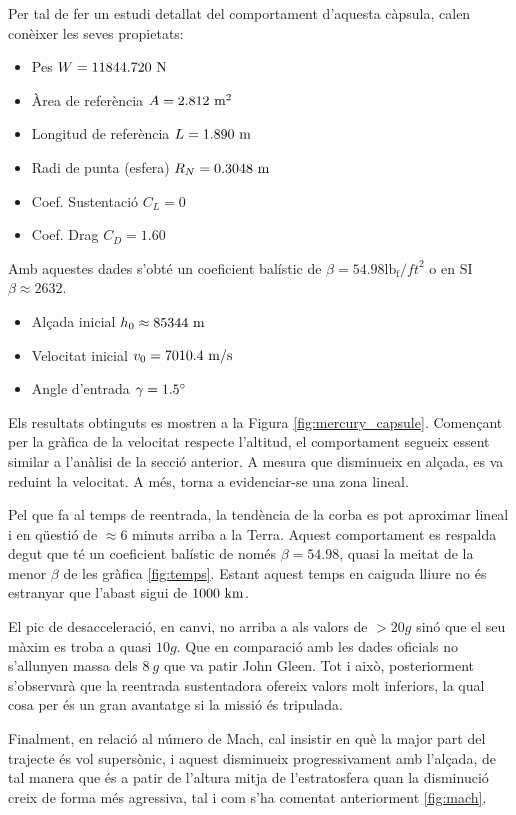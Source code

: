 Per tal de fer un estudi detallat del comportament d'aquesta càpsula, calen conèixer les seves propietats:
\begin{itemize}
    \item Pes $W = 11844.720 \ \newton$
    \item Àrea de referència $A = 2.812 \ \meter^2$
    \item Longitud de referència $L = 1.890 \ \meter$
    \item Radi de punta (esfera) $R_N = 0.3048 \ \meter$
    \item Coef. Sustentació $C_L = 0 $
    \item Coef. Drag $C_D = 1.60 $
\end{itemize}
Amb aquestes dades s'obté un coeficient balístic de $\beta=54.98 \mathrm{lb_f}/{ft}^2$ o en $\mathrm{SI}$ $\beta \approx 2632$.
\begin{itemize}
    \item Alçada inicial $h_0 \approx 85344 \ \meter$
    \item Velocitat inicial $v_0 = 7010.4 \ \meter/\second$
    \item Angle d'entrada $\gamma = 1.5 \degrees$
\end{itemize}

Els resultats obtinguts es mostren a la Figura \ref{fig:mercury_capsule}. Començant per la gràfica de la velocitat respecte l'altitud, el comportament segueix essent similar a l'anàlisi de la secció anterior. A mesura que disminueix en alçada, es va reduint la velocitat. A més, torna a evidenciar-se una zona lineal.

Pel que fa al temps de reentrada, la tendència de la corba es pot aproximar lineal i en qüestió de $\approx 6$ minuts arriba a la Terra. Aquest comportament es respalda degut que té un coeficient balístic de només $\beta=54.98$, quasi la meitat de la menor $\beta$ de les gràfica \ref{fig:temps}. Estant aquest temps en caiguda lliure no és estranyar que l'abast sigui de $1000 \ \kilo\meter$.

El pic de desacceleració, en canvi, no arriba a als valors de $>20 g$ sinó que el seu màxim es troba a quasi $10 g$. Que en comparació amb les dades oficials no s'allunyen massa dels $8 \ g$ que va patir John Gleen. Tot i això, posteriorment s'observarà que la reentrada sustentadora ofereix valors molt inferiors, la qual cosa per és un gran avantatge si la missió és tripulada.

Finalment, en relació al número de Mach, cal insistir en què la major part del trajecte és vol supersònic, i aquest disminueix progressivament amb l'alçada, de tal manera que és a patir de l'altura mitja de l'estratosfera quan la disminució creix de forma més agressiva, tal i com s'ha comentat anteriorment \ref{fig:mach}.

